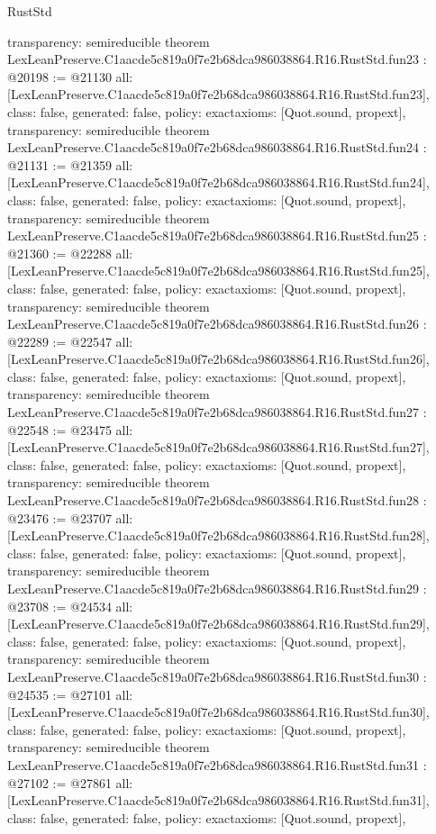 \begin{lexlean}{RustStd}
\begin{coremodule}
{  transparency: semireducible
}
theorem LexLeanPreserve.C1aacde5c819a0f7e2b68dca986038864.R16.RustStd.fun23 : @20198 := @21130 {
  all: [LexLeanPreserve.C1aacde5c819a0f7e2b68dca986038864.R16.RustStd.fun23],
  class: false,
  generated: false,
  policy: exact{axioms: [Quot.sound, propext]},
  transparency: semireducible
}
theorem LexLeanPreserve.C1aacde5c819a0f7e2b68dca986038864.R16.RustStd.fun24 : @21131 := @21359 {
  all: [LexLeanPreserve.C1aacde5c819a0f7e2b68dca986038864.R16.RustStd.fun24],
  class: false,
  generated: false,
  policy: exact{axioms: [Quot.sound, propext]},
  transparency: semireducible
}
theorem LexLeanPreserve.C1aacde5c819a0f7e2b68dca986038864.R16.RustStd.fun25 : @21360 := @22288 {
  all: [LexLeanPreserve.C1aacde5c819a0f7e2b68dca986038864.R16.RustStd.fun25],
  class: false,
  generated: false,
  policy: exact{axioms: [Quot.sound, propext]},
  transparency: semireducible
}
theorem LexLeanPreserve.C1aacde5c819a0f7e2b68dca986038864.R16.RustStd.fun26 : @22289 := @22547 {
  all: [LexLeanPreserve.C1aacde5c819a0f7e2b68dca986038864.R16.RustStd.fun26],
  class: false,
  generated: false,
  policy: exact{axioms: [Quot.sound, propext]},
  transparency: semireducible
}
theorem LexLeanPreserve.C1aacde5c819a0f7e2b68dca986038864.R16.RustStd.fun27 : @22548 := @23475 {
  all: [LexLeanPreserve.C1aacde5c819a0f7e2b68dca986038864.R16.RustStd.fun27],
  class: false,
  generated: false,
  policy: exact{axioms: [Quot.sound, propext]},
  transparency: semireducible
}
theorem LexLeanPreserve.C1aacde5c819a0f7e2b68dca986038864.R16.RustStd.fun28 : @23476 := @23707 {
  all: [LexLeanPreserve.C1aacde5c819a0f7e2b68dca986038864.R16.RustStd.fun28],
  class: false,
  generated: false,
  policy: exact{axioms: [Quot.sound, propext]},
  transparency: semireducible
}
theorem LexLeanPreserve.C1aacde5c819a0f7e2b68dca986038864.R16.RustStd.fun29 : @23708 := @24534 {
  all: [LexLeanPreserve.C1aacde5c819a0f7e2b68dca986038864.R16.RustStd.fun29],
  class: false,
  generated: false,
  policy: exact{axioms: [Quot.sound, propext]},
  transparency: semireducible
}
theorem LexLeanPreserve.C1aacde5c819a0f7e2b68dca986038864.R16.RustStd.fun30 : @24535 := @27101 {
  all: [LexLeanPreserve.C1aacde5c819a0f7e2b68dca986038864.R16.RustStd.fun30],
  class: false,
  generated: false,
  policy: exact{axioms: [Quot.sound, propext]},
  transparency: semireducible
}
theorem LexLeanPreserve.C1aacde5c819a0f7e2b68dca986038864.R16.RustStd.fun31 : @27102 := @27861 {
  all: [LexLeanPreserve.C1aacde5c819a0f7e2b68dca986038864.R16.RustStd.fun31],
  class: false,
  generated: false,
  policy: exact{axioms: [Quot.sound, propext]},
}
\end{coremodule}
\end{lexlean}
